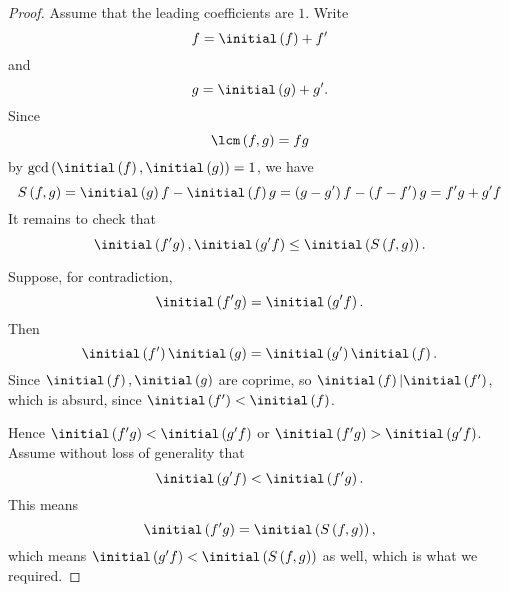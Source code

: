 \documentclass[co439]{subfiles}
\begin{document}
    \begin{proof}
        Assume that the leading coefficients are $1$. Write
        \begin{equation*}
            f = \initial\left( f \right) + f'
        \end{equation*}
        and
        \begin{equation*}
            g = \initial\left( g \right) + g'.
        \end{equation*}
        Since
        \begin{equation*}
            \lcm\left( f,g \right) = fg
        \end{equation*}
        by $\gcd\left( \initial\left( f \right),\initial\left( g \right) \right) = 1$, we have
        \begin{equation*}
            S\left( f,g \right) = \initial\left( g \right)f - \initial\left( f \right)g = \left( g-g' \right)f - \left( f-f' \right)g = f'g+g'f
        \end{equation*}
        It remains to check that
        \begin{equation*}
            \initial\left( f'g \right),\initial\left( g'f \right)\leq\initial\left( S\left( f,g \right) \right).
        \end{equation*}

        Suppose, for contradiction,
        \begin{equation*}
            \initial\left( f'g \right) = \initial\left( g'f \right).
        \end{equation*}
        Then
        \begin{equation*}
            \initial\left( f' \right)\initial\left( g \right) = \initial\left( g' \right)\initial\left( f \right).
        \end{equation*}
        Since $\initial\left( f \right),\initial\left( g \right)$ are coprime, so $\initial\left( f \right)|\initial\left( f' \right)$, which is absurd, since $\initial\left( f' \right) < \initial\left( f \right)$.

        Hence $\initial\left( f'g \right) < \initial\left( g'f \right)$ or $\initial\left( f'g \right) > \initial\left( g'f \right)$. Assume without loss of generality that
        \begin{equation*}
            \initial\left( g'f \right) < \initial\left( f'g \right).
        \end{equation*}
        This means
        \begin{equation*}
            \initial\left( f'g \right) = \initial\left( S\left( f,g \right) \right),
        \end{equation*}
        which means $\initial\left( g'f \right) < \initial\left( S\left( f,g \right) \right)$ as well, which is what we required.
    \end{proof}
    
\end{document}
